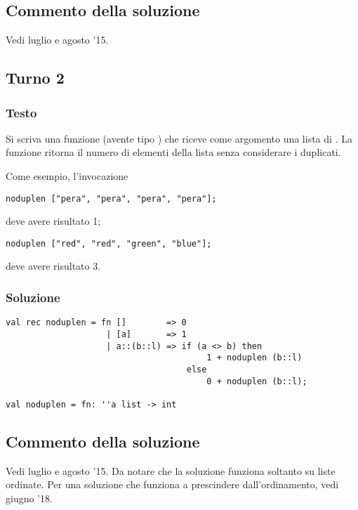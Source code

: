 \subsection{Commento della soluzione}

Vedi luglio e agosto '15.

\newpage
\subsection{Turno 2}

\subsubsection{Testo}

Si scriva una funzione  (avente tipo ) che riceve come argomento una lista di .
La funzione  ritorna il numero di elementi della lista senza considerare i duplicati.

\medskip
Come esempio, l'invocazione

\begin{lstlisting}
noduplen ["pera", "pera", "pera", "pera"];
\end{lstlisting}

deve avere risultato 1;

\begin{lstlisting}
noduplen ["red", "red", "green", "blue"];
\end{lstlisting}

deve avere risultato 3.

\subsubsection{Soluzione}

\begin{lstlisting}[style = SML, caption = {Definizione della funzione \sml{noduplen}}]
val rec noduplen = fn []		=> 0
					| [a]		=> 1
					| a::(b::l)	=> if (a <> b) then
										1 + noduplen (b::l)
									else
										0 + noduplen (b::l);

val noduplen = fn: ''a list -> int
\end{lstlisting}

\subsection{Commento della soluzione}

Vedi luglio e agosto '15.
Da notare che la soluzione funziona soltanto su liste ordinate. Per una soluzione che funziona a prescindere dall'ordinamento, vedi giugno '18.
